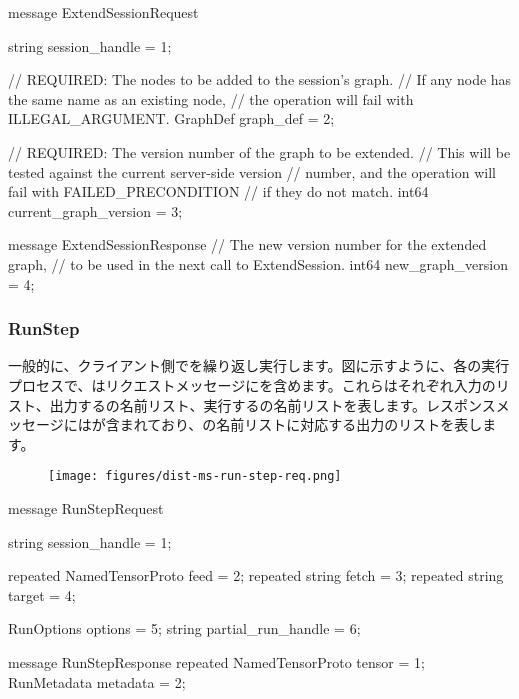 \begin{content}
\begin{leftbar}
\begin{c++}
message ExtendSessionRequest {
  string session_handle = 1;

  // REQUIRED: The nodes to be added to the session's graph. 
  // If any node has the same name as an existing node, 
  // the operation will fail with ILLEGAL\_ARGUMENT.
  GraphDef graph_def = 2;

  // REQUIRED: The version number of the graph to be extended. 
  // This will be tested against the current server-side version 
  // number, and the operation will fail with FAILED\_PRECONDITION 
  // if they do not match.
  int64 current_graph_version = 3;
}

message ExtendSessionResponse {
  // The new version number for the extended graph, 
  // to be used in the next call to ExtendSession.
  int64 new_graph_version = 4;
}
\end{c++}
\end{leftbar}

\subsubsection{RunStep}

一般的に、クライアント側でを繰り返し実行します。図に示すように、各の実行プロセスで、はリクエストメッセージにを含めます。これらはそれぞれ入力のリスト、出力するの名前リスト、実行するの名前リストを表します。レスポンスメッセージにはが含まれており、の名前リストに対応する出力のリストを表します。

\begin{figure}[H]
\centering
\texttt{[image: figures/dist-ms-run-step-req.png]}
\caption{}
 \label{fig:dist-ms-run-step-req}
\end{figure}

\begin{leftbar}
\begin{c++}
message RunStepRequest {
  string session_handle = 1;

  repeated NamedTensorProto feed = 2;
  repeated string fetch = 3;
  repeated string target = 4;

  RunOptions options = 5;
  string partial_run_handle = 6;
}

message RunStepResponse {
  repeated NamedTensorProto tensor = 1;
  RunMetadata metadata = 2;
}
\end{c++}
\end{leftbar}


\end{content}
